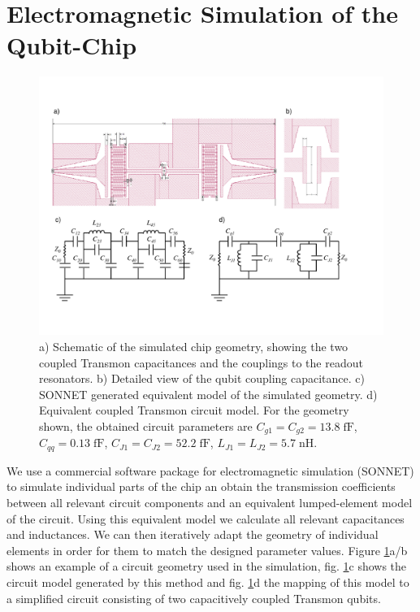 \section{Electromagnetic Simulation of the Qubit-Chip}

\begin{figure}[ht!]
	\centering
	\includegraphics[width=\textwidth]{./material/figures/2-qubit-processor/sonnet_model}
	\caption[]{a) Schematic of the simulated chip geometry, showing the two coupled Transmon capacitances and the couplings to the readout resonators. b) Detailed view of the qubit coupling capacitance. c) SONNET generated equivalent model of the simulated geometry. d) Equivalent coupled Transmon circuit model. For the geometry shown, the obtained circuit parameters are $C_{g1}=C_{g2}=13.8\;\mathrm{fF}$, $C_{qq}=0.13\;\mathrm{fF}$, $C_{J1}=C_{J2}=52.2\;\mathrm{fF}$, $L_{J1}=L_{J2}=5.7\;\mathrm{nH}$.}
	\label{fig:sonnet_generated_model}
\end{figure}

We use a commercial software package for electromagnetic simulation (SONNET) to simulate individual parts of the chip an obtain the transmission coefficients between all relevant circuit components and an equivalent lumped-element model of the circuit. Using this equivalent model we calculate all relevant capacitances and inductances. We can then iteratively adapt the geometry of individual elements in order for them to match the designed parameter values. Figure \ref{fig:sonnet_generated_model}a/b shows an example of a circuit geometry used in the simulation, fig. \ref{fig:sonnet_generated_model}c shows the circuit model generated by this method and fig. \ref{fig:sonnet_generated_model}d the mapping of this model to a simplified circuit consisting of two capacitively coupled Transmon qubits.

